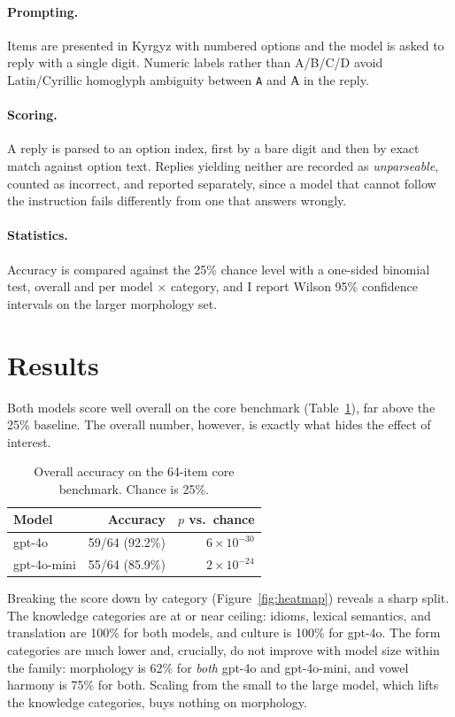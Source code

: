 \documentclass[11pt]{article}
\newcommand{\ky}[1]{\foreignlanguage{russian}{#1}}
\begin{document}
\paragraph{Prompting.} Items are presented in Kyrgyz with numbered options and the
model is asked to reply with a single digit. Numeric labels rather than A/B/C/D avoid
Latin/Cyrillic homoglyph ambiguity between \texttt{A} and \ky{А} in the reply.

\paragraph{Scoring.} A reply is parsed to an option index, first by a bare digit and
then by exact match against option text. Replies yielding neither are recorded as
\emph{unparseable}, counted as incorrect, and reported separately, since a model that
cannot follow the instruction fails differently from one that answers wrongly.

\paragraph{Statistics.} Accuracy is compared against the 25\% chance level with a
one-sided binomial test, overall and per model $\times$ category, and I report Wilson
95\% confidence intervals on the larger morphology set.

\section{Results}
\label{sec:results}

Both models score well overall on the core benchmark
(Table~\ref{tab:overall}), far above the 25\% baseline. The overall number, however,
is exactly what hides the effect of interest.

\begin{table}[h]
\centering
\small
\begin{tabular}{lrr}
\toprule
Model & Accuracy & $p$ vs.\ chance \\
\midrule
gpt-4o       & 59/64 (92.2\%) & $6\times10^{-30}$ \\
gpt-4o-mini  & 55/64 (85.9\%) & $2\times10^{-24}$ \\
\bottomrule
\end{tabular}
\caption{Overall accuracy on the 64-item core benchmark. Chance is 25\%.}
\label{tab:overall}
\end{table}

Breaking the score down by category (Figure~\ref{fig:heatmap}) reveals a sharp split.
The knowledge categories are at or near ceiling: idioms, lexical semantics, and
translation are 100\% for both models, and culture is 100\% for gpt-4o. The form
categories are much lower and, crucially, do not improve with model size within the
family: morphology is 62\% for \emph{both} gpt-4o and gpt-4o-mini, and vowel harmony
is 75\% for both. Scaling from the small to the large model, which lifts the knowledge
categories, buys nothing on morphology.
\end{document}
